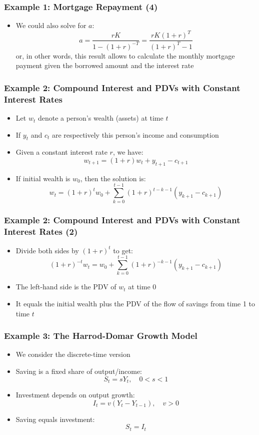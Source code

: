 \documentclass[10pt,usenames,dvipsnames]{beamer}
\theoremstyle{definition}
\begin{document}
\begin{frame}[fragile]
\frametitle{Example 1: Mortgage Repayment (4)}
\begin{itemize}
	\item We could also solve for $a$:
	\[
		a = \frac{rK}{1 - (1+r)^{-T}} = \frac{rK(1+r)^{T}}{(1+r)^{T} - 1}
	\]
	or, in other words, this result allows to calculate the monthly mortgage payment given the borrowed amount and the interest rate
\end{itemize}
\end{frame}

\begin{frame}[fragile]
\frametitle{Example 2: Compound Interest and PDVs with Constant Interest Rates}
\begin{itemize}
	\item Let $w_{t}$ denote a person's wealth (assets) at time $t$
	\item If $y_{t}$ and $c_{t}$ are respectively this person's income and consumption
	\item Given a constant interest rate $r$, we have:
	\[
		w_{t+1} = (1+r)w_{t} + y_{t+1} - c_{t+1}
	\]
	\item If initial wealth is $w_{0}$, then the solution is:
	\[
		w_{t} = (1+r)^{t}w_{0} + \sum_{k=0}^{t-1}(1+r)^{t-k-1}(y_{k+1} - c_{k+1})
	\]
\end{itemize}
\end{frame}


\begin{frame}[fragile]
\frametitle{Example 2: Compound Interest and PDVs with Constant Interest Rates (2)}
\begin{itemize}
	\item Divide both sides by $(1 + r)^{t}$ to get:
	\[
		(1+r)^{-t}w_{t} = w_{0} + \sum_{k=0}^{t-1}(1+r)^{-k-1}(y_{k+1} - c_{k+1})
	\]
	\item The left-hand side is the PDV of $w_{t}$ at time 0
	\item It equals the initial wealth plus the PDV of the flow of savings from time 1 to time $t$
\end{itemize}
\end{frame}

\begin{frame}[fragile]
\frametitle{Example 3: The Harrod-Domar Growth Model}
\begin{itemize}
	\item We consider the discrete-time version
	\item Saving is a fixed share of output/income:
	\[
		S_{t} = s Y_{t},\quad 0 < s < 1
	\]
	\item Investment depends on output growth:
	\[
		I_{t} = v(Y_{t} - Y_{t-1}), \quad v > 0
	\]
	\item Saving equals investment:
	\[
		S_{t} = I_{t}
	\]
\end{itemize}
\end{frame}
\end{document}
